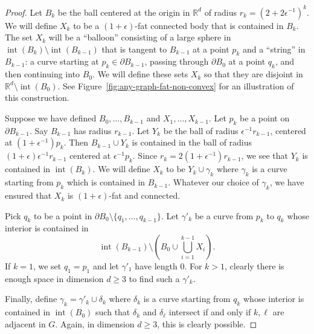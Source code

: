 \documentclass[11pt, reqno]{amsart}
\theoremstyle{plain}
\theoremstyle{definition}
\theoremstyle{remark}
\numberwithin{theorem}{section}
\numberwithin{equation}{section}
\newcommand{\paren}[1]{\left( #1 \right)}
\newcommand{\R}{\mathbb R}
\DeclareMathOperator{\inter}{int}
\begin{document}
\begin{proof}
Let $B_k$ be the ball centered at the origin in $\R^d$ of radius $r_k=(2+2\epsilon^{-1})^k$. We will define $X_k$ to be a $(1+\epsilon)$-fat connected body that is contained in $B_k$. The set $X_k$ will be a ``balloon'' consisting of a large sphere in $\inter(B_k)\setminus\inter( B_{k-1})$ that is tangent to $B_{k-1}$ at a point $p_k$ and a ``string'' in $B_{k-1}$: a curve starting at $p_k\in\partial B_{k-1}$, passing through $\partial B_0$ at a point $q_k$, and then continuing into $B_0$. We will define these sets $X_k$ so that they are disjoint in $\R^d\setminus\inter (B_0)$. See Figure~\ref{fig:any-graph-fat-non-convex} for an illustration of this construction.

Suppose we have defined $B_0,\ldots,B_{k-1}$ and $X_1,\ldots,X_{k-1}$. Let $p_k$ be a point on $\partial B_{k-1}$. Say $B_{k-1}$ has radius $r_{k-1}$. Let $Y_k$ be the ball of radius $\epsilon^{-1}r_{k-1}$, centered at $(1+\epsilon^{-1})p_k$. Then $B_{k-1}\cup Y_k$ is contained in the ball of radius $(1+\epsilon)\epsilon^{-1}r_{k-1}$ centered at $\epsilon^{-1}p_k$. Since $r_k=2(1+\epsilon^{-1})r_{k-1}$, we see that $Y_k$ is contained in $\inter (B_k)$. We will define $X_k$ to be $Y_k\cup\gamma_k$ where $\gamma_k$ is a curve starting from $p_k$ which is contained in $B_{k-1}$. Whatever our choice of $\gamma_k$, we have ensured that $X_k$ is $(1+\epsilon)$-fat and connected.

Pick $q_k$ to be a point in $\partial B_0\setminus \{q_1,\ldots, q_{k-1}\}$. Let $\gamma'_k$ be a curve from $p_k$ to $q_k$ whose interior is contained in
\[\inter(B_{k-1})\setminus\paren{B_0\cup\bigcup_{i=1}^{k-1}X_i}.\]
If $k=1$, we set $q_1=p_1$ and let $\gamma'_1$ have length 0. For $k>1$, clearly there is enough space in dimension $d\geq 3$ to find such a $\gamma'_k$.

Finally, define $\gamma_k=\gamma'_k\cup\delta_k$ where $\delta_k$ is a curve starting from $q_k$ whose interior is contained in $\inter(B_0)$ such that $\delta_k$ and $\delta_\ell$ intersect if and only if $k,\ell$ are adjacent in $G$. Again, in dimension $d\geq 3$, this is clearly possible.
\end{proof}
\end{document}

